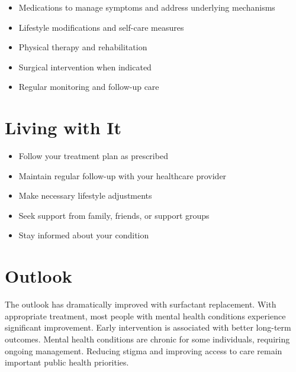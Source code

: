 \begin{itemize}[noitemsep]
  \item Medications to manage symptoms and address underlying mechanisms
  \item Lifestyle modifications and self-care measures
  \item Physical therapy and rehabilitation
  \item Surgical intervention when indicated
  \item Regular monitoring and follow-up care
\end{itemize}
\section{Living with It}
\begin{itemize}[noitemsep]
  \item Follow your treatment plan as prescribed
  \item Maintain regular follow-up with your healthcare provider
  \item Make necessary lifestyle adjustments
  \item Seek support from family, friends, or support groups
  \item Stay informed about your condition
\end{itemize}
\section{Outlook}
The outlook has dramatically improved with surfactant replacement. With appropriate treatment, most people with mental health conditions experience significant improvement. Early intervention is associated with better long-term outcomes. Mental health conditions are chronic for some individuals, requiring ongoing management. Reducing stigma and improving access to care remain important public health priorities.
